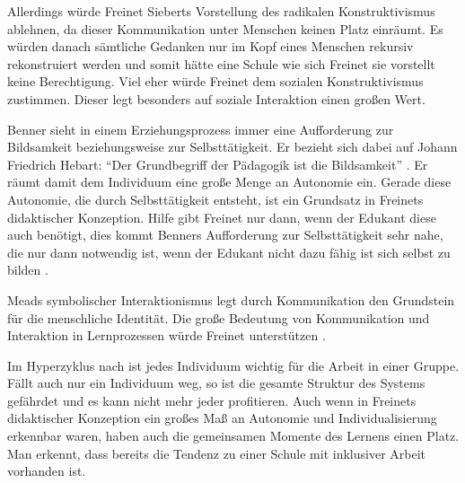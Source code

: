 Allerdings würde Freinet Sieberts Vorstellung des radikalen Konstruktivismus ablehnen, da dieser Kommunikation unter Menschen keinen Platz einräumt.
Es würden danach sämtliche Gedanken nur im Kopf eines Menschen rekursiv rekonstruiert werden \parencite[vgl.][10]{siebert-2003} und somit hätte eine Schule wie sich Freinet sie vorstellt keine Berechtigung.
Viel eher würde Freinet dem sozialen Konstruktivismus zustimmen.
Dieser legt besonders auf soziale Interaktion einen großen Wert.


Benner sieht in einem Erziehungsprozess immer eine Aufforderung zur Bildsamkeit beziehungsweise zur Selbsttätigkeit.
Er bezieht sich dabei auf Johann Friedrich Hebart:
``Der Grundbegriff der Pädagogik ist die Bildsamkeit'' \parencite[70]{benner-2012}.
Er räumt damit dem Individuum eine große Menge an Autonomie ein.
Gerade diese Autonomie, die durch Selbsttätigkeit entsteht, ist ein Grundsatz in Freinets didaktischer Konzeption.
Hilfe gibt Freinet nur dann, wenn der Edukant diese auch benötigt, dies kommt Benners Aufforderung zur Selbsttätigkeit sehr nahe, die nur dann notwendig ist, wenn der Edukant nicht dazu fähig ist sich selbst zu bilden \parencite[vgl.][91]{benner-2012}.

Meads symbolischer Interaktionismus legt durch Kommunikation den Grundstein für die menschliche Identität.
Die große Bedeutung von Kommunikation und Interaktion in Lernprozessen würde Freinet unterstützen \parencite[vgl.][109]{Freinet1979}.

Im Hyperzyklus nach \citeauthor{Zimpel2012} ist jedes Individuum wichtig für die Arbeit in einer Gruppe.
Fällt auch nur ein Individuum weg, so ist die gesamte Struktur des Systems gefährdet und es kann nicht mehr jeder profitieren.
Auch wenn in Freinets didaktischer Konzeption ein großes Maß an Autonomie und Individualisierung erkennbar waren, haben auch die gemeinsamen Momente des Lernens einen Platz.
Man erkennt, dass bereits die Tendenz zu einer Schule mit inklusiver Arbeit vorhanden ist.
